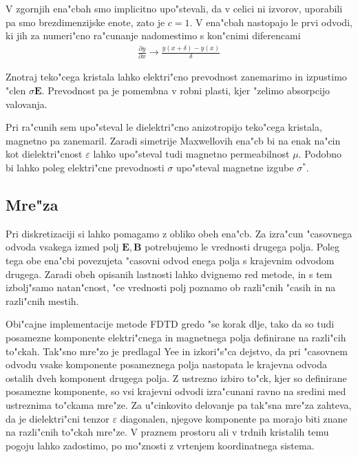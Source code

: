 \documentclass[a4paper,10pt]{article}
\renewcommand{\vec}{\mathbf}
\newcommand{\eps}{\varepsilon}
\begin{document}
V zgornjih ena"cbah smo implicitno upo"stevali, da v celici ni izvorov, uporabili pa smo brezdimenzijske enote, zato je $c=1$.
V ena"cbah nastopajo le prvi odvodi, ki jih za numeri"cno ra"cunanje nadomestimo s kon"cnimi diferencami
\begin{align}
 \frac{\partial y}{\partial x} \rightarrow \frac{y(x+\delta) - y(x)}{\delta}
\end{align}

Znotraj teko"cega kristala lahko elektri"cno prevodnost zanemarimo in izpustimo "clen $\sigma \vec E$. 
Prevodnost pa je pomembna v robni plasti, kjer "zelimo absorpcijo valovanja. 

Pri ra"cunih sem upo"steval le dielektri"cno anizotropijo teko"cega kristala, magnetno pa zanemaril. 
Zaradi simetrije Maxwellovih ena"cb bi na enak na"cin kot dielektri"cnost $\varepsilon$ lahko upo"steval tudi magnetno permeabilnost $\mu$. 
Podobno bi lahko poleg elektri"cne prevodnosti $\sigma$ upo"steval magnetne izgube $\sigma^*$. 

\subsection{Mre"za}

Pri diskretizaciji si lahko pomagamo z obliko obeh ena"cb. 
Za izra"cun "casovnega odvoda vsakega izmed polj $\vec{E}, \vec{B}$ potrebujemo le vrednosti drugega polja. 
Poleg tega obe ena"cbi povezujeta "casovni odvod enega polja s krajevnim odvodom drugega. 
Zaradi obeh opisanih lastnosti lahko dvignemo red metode, in s tem izbolj"samo natan"cnost, "ce vrednosti polj poznamo ob razli"cnih "casih in na razli"cnih mestih\cite{taflove}. 

Obi"cajne implementacije metode \acs{FDTD} gredo "se korak dlje, tako da so tudi posamezne komponente elektri"cnega in magnetnega polja definirane na razli"cih to"ckah\cite{yee, yee-lattice}.
Tak"sno mre"zo je predlagal Yee in izkori"s"ca dejstvo, da pri "casovnem odvodu vsake komponente posameznega polja nastopata le krajevna odvoda ostalih dveh komponent drugega polja. 
Z ustrezno izbiro to"ck, kjer so definirane posamezne komponente, so vsi krajevni odvodi izra"cunani ravno na sredini med ustreznima to"ckama mre"ze. 
Za u"cinkovito delovanje pa tak"sna mre"za zahteva, da je dielektri"cni tenzor $\eps$ diagonalen, njegove komponente pa morajo biti znane na razli"cnih to"ckah mre"ze. 
V praznem prostoru ali v trdnih kristalih temu pogoju lahko zadostimo, po mo"znosti z vrtenjem koordinatnega sistema.
\end{document}
